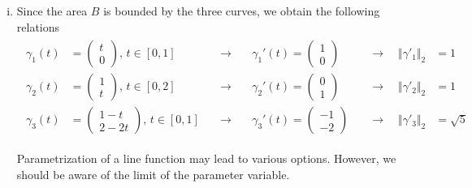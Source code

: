\documentclass[12pt]{article}
\begin{document}
\begin{enumerate}[(i)]
	\item Since the area $B$ is bounded by the three curves, we obtain the following relations
	      \begin{align}
		      \boxed{
			      \begin{aligned}
				      \gamma_1(t)
				       & = \begin{pmatrix}t\\0\end{pmatrix}, \, t\in \left[0,1\right]
				       & \quad \rightarrow
				       & \quad
				      \gamma_1'(t) = \begin{pmatrix} 1\\0 \end{pmatrix}
				       & \quad \rightarrow
				      \quad
				      \Vert \gamma'_1 \Vert_2
				       & = 1                                                                 \\
				      \gamma_2(t)
				       & = \begin{pmatrix} 1\\ t \end{pmatrix}, \, t\in \left[ 0,2 \right]
				       & \quad \rightarrow
				       & \quad
				      \gamma_2'(t) = \begin{pmatrix} 0\\ 1 \end{pmatrix}
				       & \quad \rightarrow
				      \quad
				      \Vert \gamma'_2 \Vert_2
				       & = 1                                                                 \\
				      \gamma_3(t)
				       & = \begin{pmatrix}1-t\\2-2t\end{pmatrix}, \, t\in \left[ 0,1 \right]
				       & \quad \rightarrow
				       & \quad
				      \gamma_3'(t) = \begin{pmatrix} -1 \\ -2 \end{pmatrix}
				       & \quad \rightarrow
				      \quad
				      \Vert \gamma'_3 \Vert_2
				       & = \sqrt{5}
			      \end{aligned}
		      }
	      \end{align}
	      \clearpage
	      \begin{observationboxed}
		      Parametrization of a line function may lead to various options. 
		      However, we should be aware of the limit of the parameter variable.

\end{observationboxed}
\end{enumerate}
\end{document}
